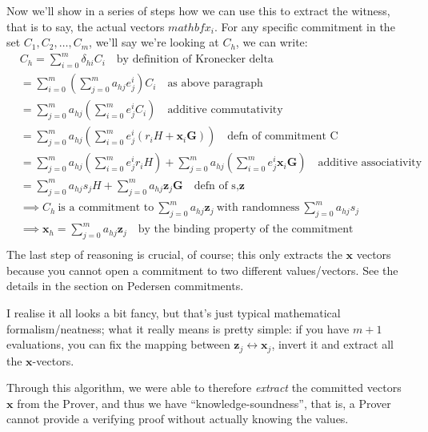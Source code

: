 \documentclass[10pt,a4paper]{article}
\begin{document}
Now we'll show in a series of steps how we can use this to extract the
witness, that is to say, the actual vectors $mathbf{x}_i$. For any specific
commitment in the set $C_1, C_2, \ldots ,C_m$, we'll say we're looking at $C_h$, we can write:
\begin{align*}
& C_h = \sum\limits_{i=0}^{m}\delta_{hi}C_{i} \quad \textrm{by definition of Kronecker delta} \\
& = \sum\limits_{i=0}^{m}\left(\sum\limits_{j=0}^{m}a_{hj}e_j^i\right)C_{i} \quad \textrm{as above paragraph} \\
& = \sum\limits_{j=0}^{m}a_{hj}\left(\sum\limits_{i=0}^{m}e_j^i C_i\right) \quad \textrm{additive commutativity} \\
& = \sum\limits_{j=0}^{m}a_{hj}\left(\sum\limits_{i=0}^{m}e_j^i \left(r_i H + \mathbf{x}_i \mathbf{G}\right)\right) \quad \textrm{defn of commitment C} \\
& = \sum\limits_{j=0}^{m}a_{hj}\left(\sum\limits_{i=0}^{m}e_j^i r_i H\right) + \sum\limits_{j=0}^{m}a_{hj}\left(\sum\limits_{i=0}^{m}e_j^i \mathbf{x}_i \mathbf{G}\right) \quad \textrm{additive associativity} \\
& = \sum\limits_{j=0}^{m} a_{hj}s_j H + \sum\limits_{j=0}^{m} a_{hj} \mathbf{z}_j \mathbf{G} \quad \textrm{defn of s,}\mathbf{z} \\
& \implies C_h \ \textrm{is a commitment to} \ \sum\limits_{j=0}^{m}a_{hj}\mathbf{z}_j \ \textrm{with randomness} \ \sum\limits_{j=0}^{m} a_{hj}s_j \\
& \implies \textbf{x}_h = \sum\limits_{j=0}^{m}a_{hj}\mathbf{z}_j \quad \textrm{by the binding property of the commitment} \\
\end{align*}
The last step of reasoning is crucial, of course; this only extracts the
$\mathbf{x}$ vectors because you cannot open a commitment to two different
values/vectors. See the details in the section on Pedersen commitments.

I realise it all looks a bit fancy, but that's just typical mathematical
formalism/neatness; what it really means is pretty simple: if you have
$m+1$ evaluations, you can fix the mapping between $\textbf{z}_j \leftrightarrow \textbf{x}_j$, invert it and extract all
the $\mathbf{x}$-vectors.

Through this algorithm, we were able to therefore \emph{extract} the
committed vectors $\mathbf{x}$ from the Prover, and thus we have
``knowledge-soundness'', that is, a Prover cannot provide a verifying
proof without actually knowing the values.
\end{document}
